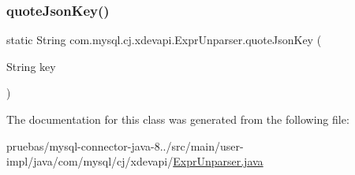 \subsubsection{\texorpdfstring{quote\+Json\+Key()}{quoteJsonKey()}}
{\footnotesize\ttfamily static String com.\+mysql.\+cj.\+xdevapi.\+Expr\+Unparser.\+quote\+Json\+Key (\begin{DoxyParamCaption}\item[{String}]{key }\end{DoxyParamCaption})\hspace{0.3cm}{\ttfamily [static]}}



The documentation for this class was generated from the following file\+:\begin{DoxyCompactItemize}
\item 
pruebas/mysql-\/connector-\/java-\/8../src/main/user-\/impl/java/com/mysql/cj/xdevapi/\mbox{\hyperlink{_expr_unparser_8java}{Expr\+Unparser.\+java}}\end{DoxyCompactItemize}
